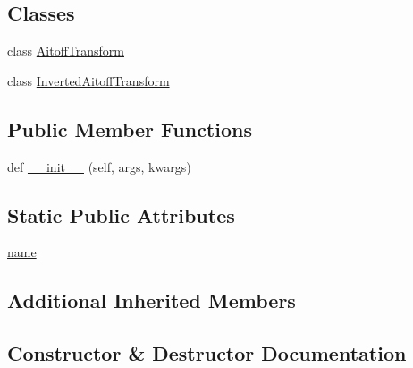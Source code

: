 \subsection*{Classes}
\begin{DoxyCompactItemize}
\item 
class \hyperlink{classmatplotlib_1_1projections_1_1geo_1_1AitoffAxes_1_1AitoffTransform}{Aitoff\+Transform}
\item 
class \hyperlink{classmatplotlib_1_1projections_1_1geo_1_1AitoffAxes_1_1InvertedAitoffTransform}{Inverted\+Aitoff\+Transform}
\end{DoxyCompactItemize}
\subsection*{Public Member Functions}
\begin{DoxyCompactItemize}
\item 
def \hyperlink{classmatplotlib_1_1projections_1_1geo_1_1AitoffAxes_a6dba3b396e7c0d4c5f50aa521171dcaa}{\+\_\+\+\_\+init\+\_\+\+\_\+} (self, args, kwargs)
\end{DoxyCompactItemize}
\subsection*{Static Public Attributes}
\begin{DoxyCompactItemize}
\item 
\hyperlink{classmatplotlib_1_1projections_1_1geo_1_1AitoffAxes_a1248da04fab849dd43f5c88286f3b5b9}{name}
\end{DoxyCompactItemize}
\subsection*{Additional Inherited Members}


\subsection{Constructor \& Destructor Documentation}
\mbox{\label{classmatplotlib_1_1projections_1_1geo_1_1AitoffAxes_a6dba3b396e7c0d4c5f50aa521171dcaa}} 

